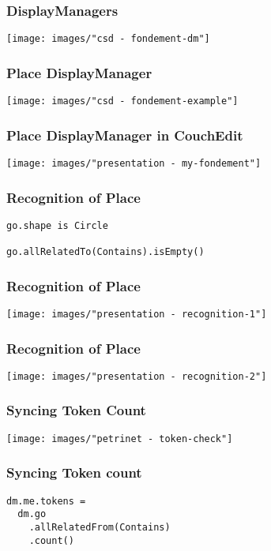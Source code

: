 \begin{frame}
  \frametitle{DisplayManagers}
  \hspace{-1cm}
  \texttt{[image: images/"csd - fondement-dm"]}
\end{frame}


\begin{frame}
  \frametitle{Place DisplayManager}
  \hspace{-1cm}
  \texttt{[image: images/"csd - fondement-example"]}
\end{frame}


\begin{frame}
  \frametitle{Place DisplayManager in CouchEdit}
  \hspace{-1cm}
  \texttt{[image: images/"presentation - my-fondement"]}
\end{frame}


\begin{frame}[fragile]
  \frametitle{Recognition of Place}
  \vspace{-1cm}
  \begin{lstlisting}
go.shape is Circle

go.allRelatedTo(Contains).isEmpty()
  \end{lstlisting}
\end{frame}

\begin{frame}
  \frametitle{Recognition of Place}
  \hspace{-1cm}
  \texttt{[image: images/"presentation - recognition-1"]}
\end{frame}

\begin{frame}
  \frametitle{Recognition of Place}
  \hspace{-1cm}
  \texttt{[image: images/"presentation - recognition-2"]}
\end{frame}

\begin{frame}
  \frametitle{Syncing Token Count}
  \centering
  \hspace{-1cm}  
  \texttt{[image: images/"petrinet - token-check"]}
\end{frame}

\begin{frame}[fragile]
  \frametitle{Syncing Token count}
  \vspace*{-2cm}
  \begin{lstlisting}
dm.me.tokens = 
  dm.go
    .allRelatedFrom(Contains)
    .count()
  \end{lstlisting}
\end{frame}

